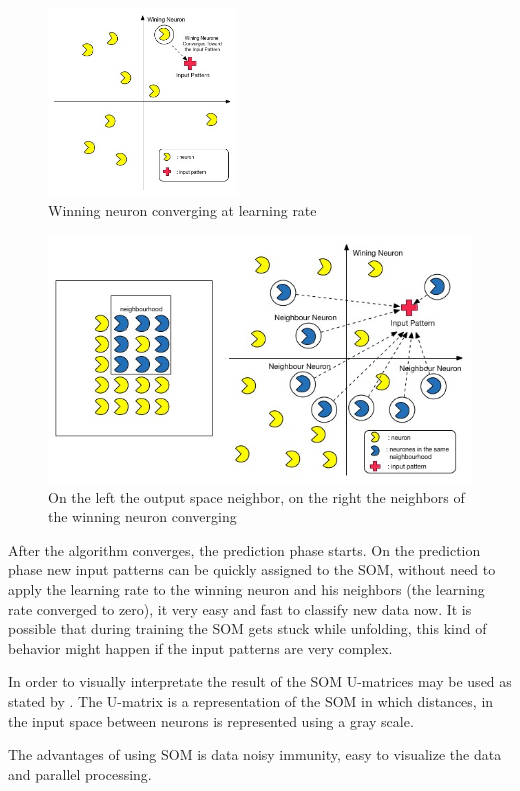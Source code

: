 \begin{figure}
  \begin{center}
    \includegraphics[width=5cm]{images/4_wining_neuron_converge.jpg}
  \end{center}
  \caption{ Winning neuron converging at learning rate }
  \label{fig:4_wining_neuron_converge}
\end{figure}

\begin{figure}
  \begin{center}
    \includegraphics[width=12cm]{images/5_neighbours_converge.jpg}
  \end{center}
  \caption{ On the left the output space neighbor, on the right the neighbors of the winning neuron converging }
  \label{fig:5_neighbours_converge}
\end{figure}

After the algorithm converges, the prediction phase starts. On the prediction phase new input patterns can be quickly assigned to the SOM, without need to apply the learning rate to the winning neuron and his neighbors (the learning rate converged to zero), it very easy and fast to classify new data now. It is possible that during training the SOM gets stuck while unfolding, this kind of behavior might happen if the input patterns are very complex.

In order to visually interpretate the result of the SOM U-matrices may be used as stated by \citep{Bacao2005}. The U-matrix is a representation of the SOM in which distances, in the input space between neurons is represented using a gray scale.

The advantages of using SOM is data noisy immunity, easy to visualize the data and parallel processing.


